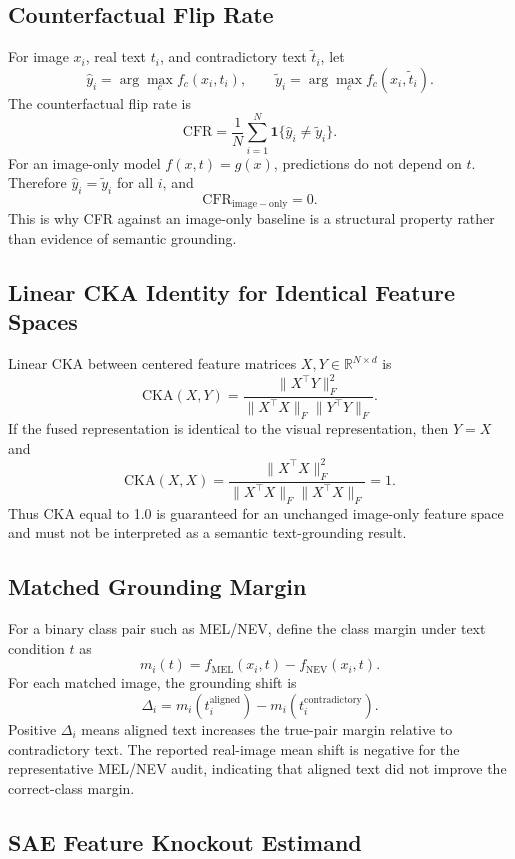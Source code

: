 \documentclass[10pt]{article}
\begin{document}
\subsection*{Counterfactual Flip Rate}

For image $x_i$, real text $t_i$, and contradictory text $\tilde{t}_i$, let
\[
\hat{y}_i = \arg\max_c f_c(x_i,t_i),
\qquad
\tilde{y}_i = \arg\max_c f_c(x_i,\tilde{t}_i).
\]
The counterfactual flip rate is
\[
\mathrm{CFR}=\frac{1}{N}\sum_{i=1}^N
\mathbf{1}\{\hat{y}_i\neq \tilde{y}_i\}.
\]
For an image-only model $f(x,t)=g(x)$, predictions do not depend on $t$.
Therefore $\hat{y}_i=\tilde{y}_i$ for all $i$, and
\[
\mathrm{CFR}_{\mathrm{image-only}}=0.
\]
This is why CFR against an image-only baseline is a structural property rather
than evidence of semantic grounding.

\subsection*{Linear CKA Identity for Identical Feature Spaces}

Linear CKA between centered feature matrices $X,Y\in\mathbb{R}^{N\times d}$ is
\[
\mathrm{CKA}(X,Y)=
\frac{\|X^\top Y\|_F^2}{\|X^\top X\|_F\|Y^\top Y\|_F}.
\]
If the fused representation is identical to the visual representation, then
$Y=X$ and
\[
\mathrm{CKA}(X,X)=
\frac{\|X^\top X\|_F^2}{\|X^\top X\|_F\|X^\top X\|_F}=1.
\]
Thus CKA equal to 1.0 is guaranteed for an unchanged image-only feature space
and must not be interpreted as a semantic text-grounding result.

\subsection*{Matched Grounding Margin}

For a binary class pair such as MEL/NEV, define the class margin under text
condition $t$ as
\[
m_i(t)=f_{\mathrm{MEL}}(x_i,t)-f_{\mathrm{NEV}}(x_i,t).
\]
For each matched image, the grounding shift is
\[
\Delta_i=m_i(t_i^{\mathrm{aligned}})-m_i(t_i^{\mathrm{contradictory}}).
\]
Positive $\Delta_i$ means aligned text increases the true-pair margin relative
to contradictory text. The reported real-image mean shift is negative for the
representative MEL/NEV audit, indicating that aligned text did not improve the
correct-class margin.

\subsection*{SAE Feature Knockout Estimand}
\end{document}

